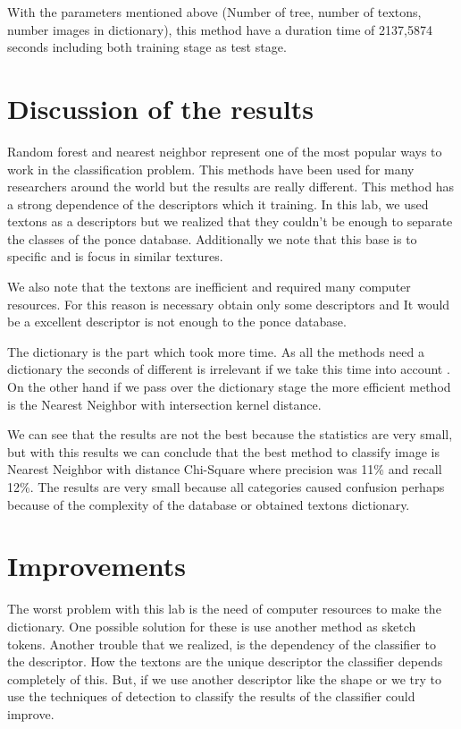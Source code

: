 \documentclass[10pt,twocolumn,letterpaper]{article}
\begin{document}
With the parameters mentioned above (Number of tree, number of textons, number images in dictionary), this method have a duration time of 2137,5874 seconds including both training stage as test stage. 


\section{Discussion of the results}

Random forest and nearest neighbor represent one of the most popular ways to work in the classification problem. This methods have been used  for many researchers around the world but the results are really different. This method has a strong dependence of the descriptors which it training. In this lab, we used textons as a descriptors but we realized that they couldn't be enough to separate the classes of the ponce database. Additionally we note that this base is to specific and is focus in similar textures. 

We also note that the textons are inefficient and required many computer resources. For this reason is necessary obtain only some descriptors and It would be a excellent descriptor is not enough to the ponce database.

The dictionary is the part which took more time. As all the methods need a dictionary the seconds of different is irrelevant if we take this time into account . On the other hand if we pass over the dictionary stage the more efficient method is the Nearest Neighbor with intersection kernel distance.

We can see that the results are not the best because the statistics are very small, but with this results we can conclude that the best method to classify image is  Nearest Neighbor with distance Chi-Square where precision was 11\% and recall 12\%. The results are very small because all categories caused confusion perhaps because of the complexity of the database or obtained textons dictionary. 

\section{Improvements}
The worst problem with this lab is the need of computer resources to make the dictionary. One possible solution for these is use another method as sketch tokens. Another trouble that we realized, is the dependency of the classifier to the descriptor. How the textons are the unique descriptor the classifier depends completely of this. But, if we use another descriptor like the shape or we try to use the techniques of detection to classify the results of the classifier could improve.
\end{document}
